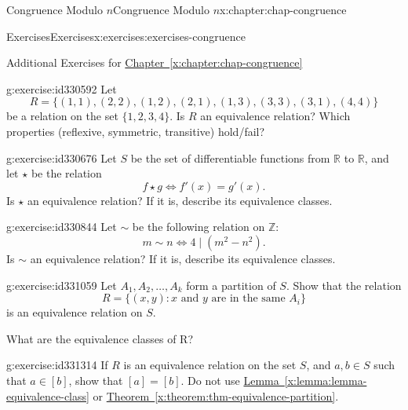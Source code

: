 \documentclass[oneside,10pt,]{book}
\newcommand{\xreffont}{\relax}
\numberwithin{equation}{section}
\begin{document}
\begin{chapterptx}{Congruence Modulo \(n\)}{}{Congruence Modulo \(n\)}{}{}{x:chapter:chap-congruence}
\begin{exercises-section}{Exercises}{}{Exercises}{}{}{x:exercises:exercises-congruence}
\begin{introduction}{}%
Additional Exercises for \hyperref[x:chapter:chap-congruence]{Chapter~{\xreffont\ref{x:chapter:chap-congruence}}}%
\end{introduction}%
\begin{divisionexercise}{1}{}{}{g:exercise:id330592}%
Let%
\begin{equation*}
R = \{(1,1),(2,2),(1,2),(2,1),(1,3),(3,3),(3,1),(4,4)\}
\end{equation*}
be a relation on the set \(\{1,2,3,4\}\). Is \(R\) an equivalence relation? Which properties (reflexive, symmetric, transitive) hold\slash{}fail?%
\end{divisionexercise}%
\begin{divisionexercise}{2}{}{}{g:exercise:id330676}%
Let \(S\) be the set of differentiable functions from \(\mathbb{R}\) to \(\mathbb{R}\), and let \(\star\) be the relation%
\begin{equation*}
f \star g \Leftrightarrow f'(x) = g'(x)\text{.}
\end{equation*}
Is \(\star\) an equivalence relation? If it is, describe its equivalence classes.%
\end{divisionexercise}%
\begin{divisionexercise}{3}{}{}{g:exercise:id330844}%
Let \(\sim\) be the following relation on \(\mathbb{Z}\):%
\begin{equation*}
m \sim n \Leftrightarrow 4 \mid (m^2 - n^2)\text{.}
\end{equation*}
Is \(\sim\) an equivalence relation? If it is, describe its equivalence classes.%
\end{divisionexercise}%
\begin{divisionexercise}{4}{}{}{g:exercise:id331059}%
Let \(A_1, A_2, \ldots, A_k\) form a partition of \(S\). Show that the relation%
\begin{equation*}
R = \{(x,y) : x \text{ and } y \text{ are in the same $A_i$}\}
\end{equation*}
is an equivalence relation on \(S\).%
\par
What are the equivalence classes of \textdollar{}R\textdollar{}?%
\end{divisionexercise}%
\begin{divisionexercise}{5}{}{}{g:exercise:id331314}%
If \(R\) is an equivalence relation on the set \(S\), and \(a, b \in S\) such that \(a \in [b]\), show that \([a] = [b]\). Do not use \hyperref[x:lemma:lemma-equivalence-class]{Lemma~{\xreffont\ref{x:lemma:lemma-equivalence-class}}} or \hyperref[x:theorem:thm-equivalence-partition]{Theorem~{\xreffont\ref{x:theorem:thm-equivalence-partition}}}.%

\end{divisionexercise}
\end{exercises-section}
\end{chapterptx}
\end{document}
